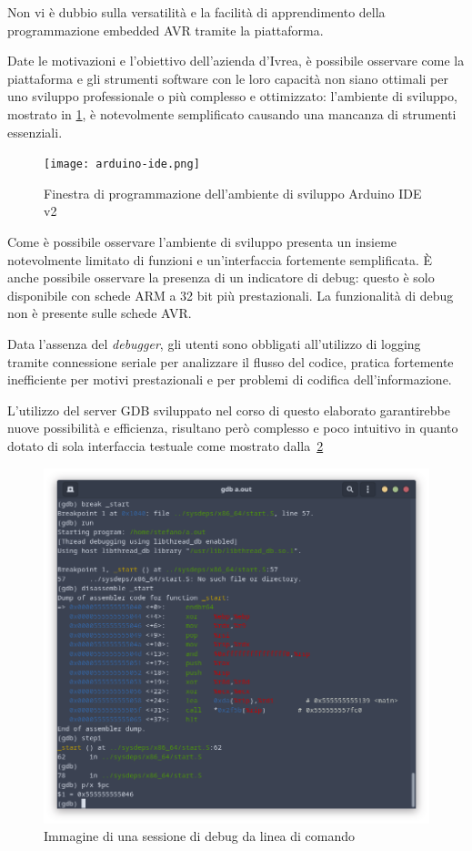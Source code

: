 Non vi è dubbio sulla versatilità e la facilità di apprendimento della programmazione embedded AVR tramite la piattaforma.

Date le motivazioni e l'obiettivo dell'azienda d'Ivrea, è possibile osservare come la piattaforma e gli strumenti software con le loro  capacità non siano ottimali per uno sviluppo professionale o più complesso e ottimizzato: l'ambiente di sviluppo, mostrato in \cref{fig:arduino-ide}, è notevolmente semplificato causando una mancanza di strumenti essenziali.

\begin{figure}
    \centering
    \texttt{[image: arduino-ide.png]}
    \caption[Immagine del software Arduino IDE v2]{Finestra di programmazione dell'ambiente di sviluppo Arduino IDE v2}\label{fig:arduino-ide}
\end{figure}

Come è possibile osservare l'ambiente di sviluppo presenta un insieme notevolmente limitato di funzioni e un'interfaccia fortemente semplificata. È anche possibile osservare la presenza di un indicatore di debug: questo è solo disponibile con schede ARM a 32 bit più prestazionali. La funzionalità di debug non è presente sulle schede AVR.\@

Data l'assenza del \textit{debugger}, gli utenti sono obbligati all'utilizzo di logging tramite connessione seriale per analizzare il flusso del codice, pratica fortemente inefficiente per motivi prestazionali e per problemi di codifica dell'informazione.

L'utilizzo del server GDB sviluppato nel corso di questo elaborato garantirebbe nuove possibilità e efficienza, risultano però complesso e poco intuitivo in quanto dotato di sola interfaccia testuale come mostrato dalla~\cref{fig:gdb-cli}

\begin{figure}
    \centering
    \includegraphics[width=.7\textwidth]{gdb-cli.png}
    \caption[]{Immagine di una sessione di debug da linea di comando}\label{fig:gdb-cli}
\end{figure}

